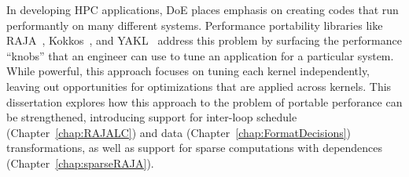 In developing HPC applications, DoE places emphasis on creating codes that run performantly on many different systems.
Performance portability libraries like RAJA~\cite{hornung2014RAJA}, Kokkos~\cite{edwards2014kokkos}, and YAKL~\cite{yakl} address this problem by surfacing the performance ``knobs'' that an engineer can use to tune an application for a particular system. 
While powerful, this approach focuses on tuning each kernel independently, leaving out opportunities for optimizations that are applied across kernels.
This dissertation explores how this approach to the problem of portable perforance can be strengthened, introducing support for inter-loop schedule (Chapter~\ref{chap:RAJALC}) and data (Chapter~\ref{chap:FormatDecisions}) transformations, as well as support for sparse computations with dependences (Chapter~\ref{chap:sparseRAJA}).

